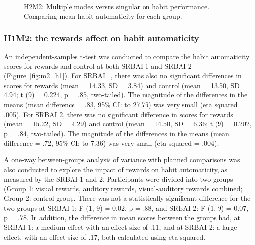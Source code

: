 \begin{figure}[H]
  \caption{H2M2: Multiple modes versus singular on habit performance. Comparing mean habit automaticity for each group.}~\label{fig:m2_h2}
\end{figure}


\subsubsection*{H1M2: the rewards affect on habit automaticity}
An independent-samples t-test was conducted to compare the habit automaticity scores
for rewards and control at both SRBAI 1 and SRBAI 2 (Figure~\ref{fig:m2_h1}). For SRBAI 1, there was also no significant differences in scores for rewards (mean = 14.33, SD = 3.84) and control (mean = 13.50, SD = 4.94; t (9) = 0.224, p = .85,
two-tailed). The magnitude of the differences in the means (mean difference = .83,
95\% CI:  to 27.76) was very small (eta squared = .005). For SRBAI 2, there was no significant difference in scores for rewards
(mean = 15.22, SD = 4.29) and control (mean = 14.50, SD = 6.36; t (9) = 0.202, p = .84,
two-tailed). The magnitude of the differences in the means (mean difference = .72,
95\% CI:  to 7.36) was very small (eta squared = .004).


A one-way between-groups analysis of variance with planned comparisons was also conducted to explore the impact of rewards on habit automaticity, as measured by the SRBAI 1 and 2. Participants were divided into two groups (Group 1: visual rewards, auditory rewards, visual-auditory rewards combined; Group 2: control group. There was not a
statistically significant difference for the two groups at SRBAI 1: F (1, 9) = 0.02, p = .88, and SRBAI 2: F (1, 9) = 0.07, p = .78. In addition, the difference in mean scores between the groups had, at SRBAI 1: a medium effect with an effect size of .11, and at SRBAI 2: a large effect, with an effect size of .17, both calculated using eta squared.

